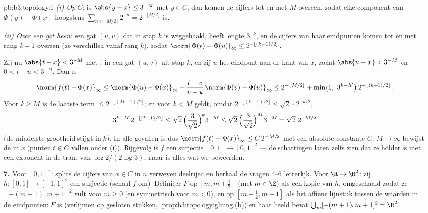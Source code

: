 \begin{solution}{pb:b3:topology:1}
\emph{(i) Op $C$}: is $\abs{y - x} \leq 3^{-M}$ met $y \in C$, dan
komen de cijfers tot en met $M$ overeen, zodat elke component van
$\Phi(y) - \Phi(x)$ hoogstens $\sum_{n > \lfloor M/2\rfloor}
2^{-n} = 2^{-\lfloor M/2\rfloor}$ is.

\emph{(ii) Over een gat heen}: een gat $(u,v)$ dat in stap $k$ is
weggehaald, heeft lengte $3^{-k}$, en de cijfers van haar
eindpunten komen tot en met rang $k - 1$ overeen (ze verschillen
vanaf rang $k$), zodat $\norm{\Phi(v) - \Phi(u)}_\infty \leq
2^{-\lfloor (k-1)/2\rfloor}$.

Zij nu $\abs{t - x} < 3^{-M}$ met $t$ in een gat $(u, v)$ uit stap
$k$, en zij $u$ het eindpunt aan de kant van $x$, zodat $\abs{u -
x} < 3^{-M}$ en $0 < t - u < 3^{-M}$. Dan is
\[
\norm{f(t) - \Phi(x)}_\infty
\leq \norm{\Phi(u) - \Phi(x)}_\infty
+ \frac{t - u}{v - u}\,\norm{\Phi(v) - \Phi(u)}_\infty
\leq 2^{-\lfloor M/2\rfloor} + \min\bigl(1,\ 3^{k - M}\bigr)\,
2^{-\lfloor(k-1)/2\rfloor} .
\]
Voor $k \geq M$ is de laatste term $\leq 2^{-\lfloor(M-1)/2
\rfloor}$; en voor $k < M$ geldt, omdat $2^{-\lfloor(k-1)/2\rfloor}
\leq \sqrt2\,\cdot 2^{-k/2}$,
\[
3^{k-M}\,2^{-\lfloor(k-1)/2\rfloor}
\leq \sqrt2\,\Bigl(\frac{3}{\sqrt2}\Bigr)^{k} 3^{-M}
\leq \sqrt2\,\Bigl(\frac{3}{\sqrt2}\Bigr)^{M} 3^{-M}
= \sqrt2\; 2^{-M/2}
\]
(de middelste grootheid stijgt in $k$). In alle gevallen is dus
$\norm{f(t) - \Phi(x)}_\infty \leq C\,2^{-M/2}$ met een absolute
constante $C$: $M \to \infty$ bewijst de  in $x$
(punten $t \in C$ vallen onder (i)). Bijgevolg is $f$ een 
surjectie $[0,1] \to [0,1]^2$ --- de schattingen laten zelfs zien
dat ze hölder is met een exponent in de trant van $\log 2/(2\log
3)$, maar  is alles wat we beweerden.

\textbf{7.} Voor $[0,1]^n$: splits de cijfers van $x \in C$ in $n$
verweven deelrijen en herhaal de vragen 4--6 letterlijk. Voor $\R
\to \R^2$: zij $h \colon [0,1] \to [-1,1]^2$ een 
surjectie (schaal $f$ om). Definieer $F$ op $[m, m + \frac12]$
(met $m \in \Z$) als een kopie van $h$, omgeschaald zodat ze
$[-(m+1), m+1]^2$ vult voor $m \geq 0$ (en symmetrisch voor $m <
0$), en op $[m + \frac12, m + 1]$ als het affiene lijnstuk tussen
de waarden in de eindpunten: $F$ is  (verlijmen op gesloten
stukken, \cref{prop:b3:topology:gluing}(b)) en haar beeld bevat
$\bigcup_m [-(m+1), m+1]^2 = \R^2$.


\end{solution}
